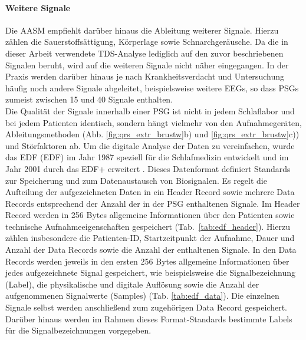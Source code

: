 \paragraph{Weitere Signale}
Die \acs{AASM} empfiehlt darüber hinaus die Ableitung weiterer Signale. Hierzu zählen die Sauerstoffsättigung, Körperlage sowie Schnarchgeräusche. Da die in dieser Arbeit verwendete \acs{TDS}-Analyse lediglich auf den zuvor beschriebenen Signalen beruht, wird auf die weiteren Signale nicht näher eingegangen. In der Praxis werden darüber hinaus je nach Krankheitsverdacht und Untersuchung häufig noch andere Signale abgeleitet, beispielsweise weitere \acs{EEG}s, so dass \acs{PSG}s zumeist zwischen 15 und 40 Signale enthalten. \\

Die Qualität der Signale innerhalb einer \acs{PSG} ist nicht in jedem Schlaflabor und bei jedem Patienten identisch, sondern hängt vielmehr von den Aufnahmegeräten, Ableitungsmethoden (Abb. \ref{fig:qrs_extr_brustw}b) und \ref{fig:qrs_extr_brustw}c)) und Störfaktoren ab. Um die digitale Analyse der Daten zu vereinfachen, wurde das \acl{EDF} (\acs{EDF}) im Jahr 1987 speziell für die Schlafmedizin entwickelt und im Jahr 2001 durch das EDF+ erweitert \parencite{kemp_european_????}. Dieses Datenformat definiert Standards zur Speicherung und zum Datenaustausch von Biosignalen. Es regelt die Aufteilung der aufgezeichneten Daten in ein Header Record sowie mehrere Data Records entsprechend der Anzahl der in der \acs{PSG} enthaltenen Signale. Im Header Record werden in 256 Bytes allgemeine Informationen über den Patienten sowie technische Aufnahmeeigenschaften gespeichert (Tab.~\ref{tab:edf_header}). Hierzu zählen insbesondere die Patienten-ID, Startzeitpunkt der Aufnahme, Dauer und Anzahl der Data Records sowie die Anzahl der enthaltenen Signale. In den Data Records werden jeweils in den ersten 256 Bytes allgemeine Informationen über jedes aufgezeichnete Signal gespeichert, wie beispielsweise die Signalbezeichnung (Label), die physikalische und digitale Auflösung sowie die Anzahl der aufgenommenen Signalwerte (Samples) (Tab. \ref{tab:edf_data}). Die einzelnen Signale selbst werden anschließend zum zugehörigen Data Record gespeichert. Darüber hinaus werden im Rahmen dieses Format-Standards bestimmte Labels für die Signalbezeichnungen vorgegeben. \parencite{kemp_european_2003}

